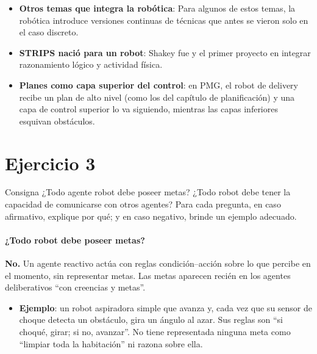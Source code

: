 \documentclass[11pt,a4paper]{article}
\begin{document}
\begin{extras}
\begin{itemize}
  \item \textbf{Otros temas que integra la robótica}:  Para algunos de estos temas, la robótica introduce versiones continuas de técnicas que antes se vieron solo en el caso discreto.
  \item \textbf{STRIPS nació para un robot}:  Shakey fue  y el primer proyecto en integrar razonamiento lógico y actividad física.
  \item \textbf{Planes como capa superior del control}: en PMG, el robot de delivery recibe un plan de alto nivel (como los del capítulo de planificación) y una capa de control superior lo va siguiendo, mientras las capas inferiores esquivan obstáculos.
\end{itemize}
\end{extras}

\section{Ejercicio 3}

\begin{enunciado}{Consigna}
¿Todo agente robot debe poseer metas? ¿Todo robot debe tener la capacidad de comunicarse con otros agentes? Para cada pregunta, en caso afirmativo, explique por qué; y en caso negativo, brinde un ejemplo adecuado.
\end{enunciado}

\paragraph{¿Todo robot debe poseer metas?} \textbf{No.} Un agente reactivo actúa con reglas condición--acción sobre lo que percibe en el momento, sin representar metas. Las metas aparecen recién en los agentes deliberativos ``con creencias y metas''.
\begin{itemize}
  \item \textbf{Ejemplo}: un robot aspiradora simple que avanza y, cada vez que su sensor de choque detecta un obstáculo, gira un ángulo al azar. Sus reglas son ``si choqué, girar; si no, avanzar''. No tiene representada ninguna meta como ``limpiar toda la habitación'' ni razona sobre ella.
\end{itemize}
\end{document}
